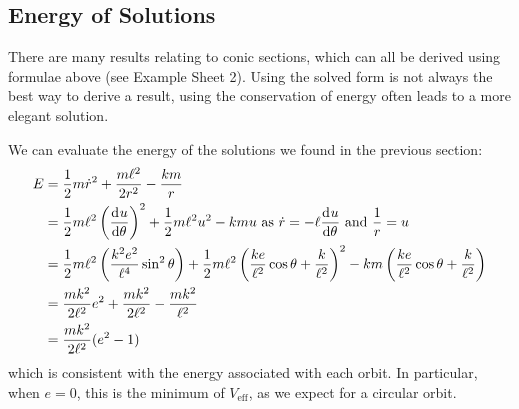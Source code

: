 \documentclass[../main.tex]{subfiles}
\begin{document}
\subsection{Energy of Solutions}
\label{keplerEnergy}
There are many results relating to conic sections, which can all be derived using formulae above (see Example Sheet 2).
Using the solved form is not always the best way to derive a result, using the conservation of energy often leads to a more elegant solution.

We can evaluate the energy of the solutions we found in the previous section:
\begin{align*}
  E &= \frac{1}{2}m \dot{r}^2 + \frac{m\ell^2}{2r^2} - \frac{km}{r} \\
    &= \frac{1}{2}m \ell^2 \left(\deriv{u}{\theta}\right)^2 + \frac{1}{2} m\ell^2 u^2 - kmu \text{ as $\dot{r} = -\ell \deriv{u}{\theta}$ and $\frac{1}{r} = u$} \\
    &= \frac{1}{2}m \ell^2 \left(\frac{k^2e^2}{\ell^4} \sin^2 \theta\right) + \frac{1}{2} m\ell^2 \left(\frac{k e}{\ell^2} \cos \theta + \frac{k}{\ell^2}\right)^2 - km\left(\frac{ke}{\ell^2}\cos\theta + \frac{k}{\ell^2}\right) \\
    &= \frac{m k^2}{2\ell^2}e^2 + \frac{m k^2}{2\ell^2} - \frac{mk^2}{\ell^2} \\
    &= \frac{mk^2}{2\ell^2} (e^2 - 1)
\end{align*}
which is consistent with the energy associated with each orbit.
In particular, when $e = 0$, this is the minimum of $V_{\text{eff}}$, as we expect for a circular orbit.
\end{document}
